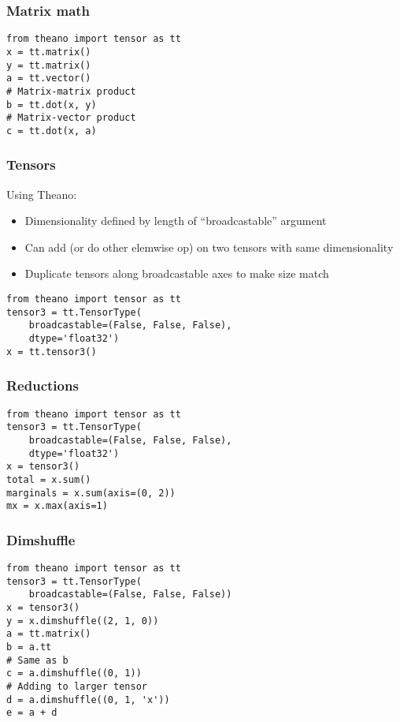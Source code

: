 \documentclass[utf8x,xcolor=pdftex,dvipsnames,table]{beamer}
\begin{document}
\begin{frame}[fragile]
  \frametitle{Matrix math}

\begin{lstlisting}
from theano import tensor as tt
x = tt.matrix()
y = tt.matrix()
a = tt.vector()
# Matrix-matrix product
b = tt.dot(x, y)
# Matrix-vector product
c = tt.dot(x, a)
\end{lstlisting}
\end{frame}

\begin{frame}[fragile]
  \frametitle{Tensors}
  Using Theano:
  \begin{itemize}
  \item Dimensionality defined by length of ``broadcastable'' argument
  \item Can add (or do other elemwise op) on two
    tensors with same dimensionality
  \item Duplicate tensors along broadcastable axes to make size match
  \end{itemize}
\begin{lstlisting}
from theano import tensor as tt
tensor3 = tt.TensorType(
    broadcastable=(False, False, False),
    dtype='float32')
x = tt.tensor3()
\end{lstlisting}
\end{frame}

\begin{frame}[fragile]
  \frametitle{Reductions}
\begin{lstlisting}
from theano import tensor as tt
tensor3 = tt.TensorType(
    broadcastable=(False, False, False),
    dtype='float32')
x = tensor3()
total = x.sum()
marginals = x.sum(axis=(0, 2))
mx = x.max(axis=1)
\end{lstlisting}
\end{frame}

\begin{frame}[fragile]
  \frametitle{Dimshuffle}

\begin{lstlisting}
from theano import tensor as tt
tensor3 = tt.TensorType(
    broadcastable=(False, False, False))
x = tensor3()
y = x.dimshuffle((2, 1, 0))
a = tt.matrix()
b = a.tt
# Same as b
c = a.dimshuffle((0, 1))
# Adding to larger tensor
d = a.dimshuffle((0, 1, 'x'))
e = a + d
\end{lstlisting}
\end{frame}
\end{document}
